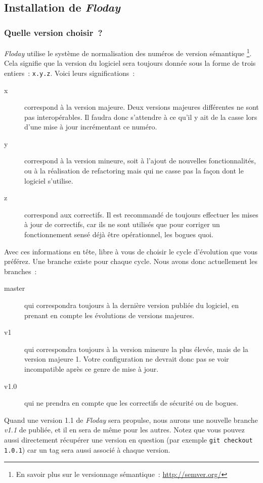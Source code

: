 \subsection{Installation de \emph{Floday}}

\subsubsection{Quelle version choisir~?}

\emph{Floday} utilise le système de normalisation des numéros de version sémantique%
\footnote{En savoir plus sur le versionnage sémantique~: \url{http://semver.org/}}.
Cela signifie que la version du logiciel sera toujours donnée sous la forme de trois entiers~: {\tt{}x.y.z}.
Voici leurs significations~:

\begin{description}
	\item[x] correspond à la version majeure. Deux versions majeures différentes ne sont pas interopérables.
Il faudra donc s'attendre à ce qu'il y ait de la casse lors d'une mise à jour incrémentant ce numéro.
	\item[y] correspond à la version mineure, soit à l'ajout de nouvelles fonctionnalités, ou à la réalisation de refactoring mais qui ne casse pas la façon dont le logiciel s'utilise.
	\item[z] correspond aux correctifs. Il est recommandé de toujours effectuer les mises à jour de correctifs, car ils ne sont utilisés que pour corriger un fonctionnement sensé déjà être opérationnel, les bogues quoi.
\end{description}

Avec ces informations en tête, libre à vous de choisir le cycle d'évolution que vous préférez. Une branche existe pour chaque cycle. Nous avons donc actuellement les branches~:
\begin{description}
	\item[master] qui correspondra toujours à la dernière version publiée du logiciel, en prenant en compte les évolutions de versions majeures.
	\item[v1] qui correspondra toujours à la version mineure la plus élevée, mais de la version majeure 1. Votre configuration ne devrait donc pas se voir incompatible après ce genre de mise à jour.
	\item[v1.0] qui ne prendra en compte que les correctifs de sécurité ou de bogues.
\end{description}

Quand une version 1.1 de \emph{Floday} sera \gls{propulse}, nous aurons une nouvelle branche \emph{v1.1} de publiée, et il en sera de même pour les autres.
Notez que vous pouvez aussi directement récupérer une version en question (par exemple {\tt git checkout 1.0.1}) car un tag sera aussi associé à chaque version.

